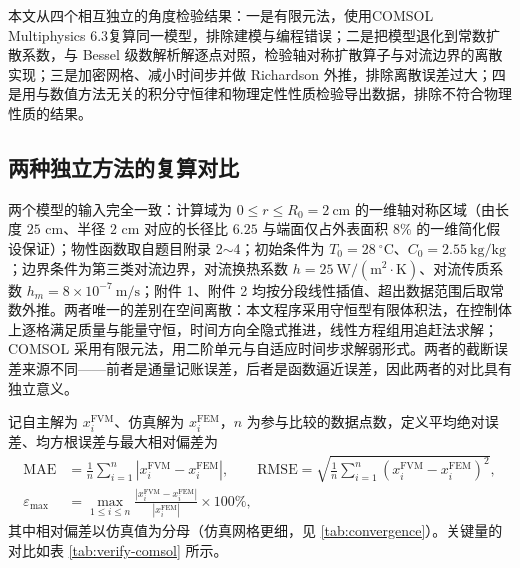 \documentclass[12pt,a4paper]{article}
\begin{document}
本文从四个相互独立的角度检验结果：一是有限元法，使用COMSOL Multiphysics 6.3复算同一模型，排除建模与编程错误；二是把模型退化到常数扩散系数，与 Bessel 级数解析解逐点对照，检验轴对称扩散算子与对流边界的离散实现；三是加密网格、减小时间步并做 Richardson 外推，排除离散误差过大；四是用与数值方法无关的积分守恒律和物理定性性质检验导出数据，排除不符合物理性质的结果。

\subsection{两种独立方法的复算对比}

两个模型的输入完全一致：计算域为 $0\le r\le R_0=2\ \mathrm{cm}$ 的一维轴对称区域（由长度 $25$ cm、半径 $2$ cm 对应的长径比 $6.25$ 与端面仅占外表面积 $8\%$ 的一维简化假设保证）；物性函数取自题目附录 2$\sim$4；初始条件为 $T_0=28\ \mathrm{^\circ C}$、$C_0=2.55\ \mathrm{kg/kg}$；边界条件为第三类对流边界，对流换热系数 $h=25\ \mathrm{W/(m^2\cdot K)}$、对流传质系数 $h_m=8\times10^{-7}\ \mathrm{m/s}$；附件 1、附件 2 均按分段线性插值、超出数据范围后取常数外推。两者唯一的差别在空间离散：本文程序采用守恒型有限体积法，在控制体上逐格满足质量与能量守恒，时间方向全隐式推进，线性方程组用追赶法求解；COMSOL 采用有限元法，用二阶单元与自适应时间步求解弱形式。两者的截断误差来源不同——前者是通量记账误差，后者是函数逼近误差，因此两者的对比具有独立意义。

记自主解为 $x_i^{\mathrm{FVM}}$、仿真解为 $x_i^{\mathrm{FEM}}$，$n$ 为参与比较的数据点数，定义平均绝对误差、均方根误差与最大相对偏差为
\begin{equation}
\begin{aligned}
\mathrm{MAE}&=\frac{1}{n}\sum_{i=1}^{n}\left|x_i^{\mathrm{FVM}}-x_i^{\mathrm{FEM}}\right|,\qquad
\mathrm{RMSE}=\sqrt{\frac{1}{n}\sum_{i=1}^{n}\left(x_i^{\mathrm{FVM}}-x_i^{\mathrm{FEM}}\right)^2},\\
\varepsilon_{\max}&=\max_{1\le i\le n}\frac{\left|x_i^{\mathrm{FVM}}-x_i^{\mathrm{FEM}}\right|}{\left|x_i^{\mathrm{FEM}}\right|}\times100\%,
\end{aligned}
\end{equation}
其中相对偏差以仿真值为分母（仿真网格更细，见 \ref{tab:convergence}）。关键量的对比如表 \ref{tab:verify-comsol} 所示。
\end{document}

